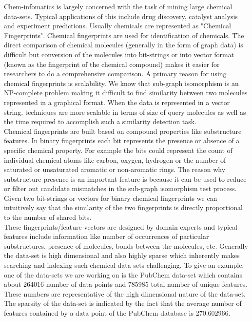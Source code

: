 
%
%

Chem-infomatics is largely concerned with the task of mining large chemical data-sets. Typical applications of this include drug discovery, catalyst analysis and experiment predictions. Usually chemicals are represented as "Chemical Fingerprints". Chemical fingerprints are used for identification of chemicals.  The direct comparison of chemical molecules (generally in the form of graph data) is difficult but conversion of the molecules into bit-strings or into vector format (known as the fingerprint of the chemical compound) makes it easier for researchers to do a comprehensive comparison. A primary reason for using chemical fingerprints is scalability. We know that sub-graph isomorphism is an NP-complete problem making it difficult to find similarity between two molecules represented in a graphical format. When the data is represented in a vector string, techniques are more scalable in terms of size of query molecules as well as the time required to accomplish such a similarity detection task.\\

Chemical fingerprints are built based on compound properties like substructure features. In binary fingerprints each bit represents the presence or absence of a specific chemical property. For example the bits could represent the count of individual chemical atoms like carbon, oxygen, hydrogen or the number of saturated or unsaturated aromatic or non-aromatic rings. The reason why substructure presence is an important feature is because it can be used to reduce or filter out candidate mismatches in the sub-graph isomorphism test process. Given two bit-strings or vectors for binary chemical  fingerprints we can intuitively say that the similarity of the two fingerprints is directly proportional to the number of shared bits. \\

These fingerprints/feature vectors are designed by domain experts and typical features include information like number of occurrences of particular substructures, presence of molecules, bonds between the molecules, etc. Generally the data-set is high dimensional and also highly sparse which inherently makes searching and indexing such chemical data sets challenging. To give an example, one of the data-sets we are working on is the PubChem data-set which contains about 264016 number of data points and 785985 total number of unique features. These numbers are representative of the high dimensional nature of the data-set. The sparsity of the data-set is indicated by the fact that the average number of features contained by a data point of the PubChem database is 270.602966.
	
